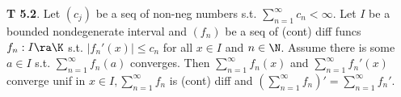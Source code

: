 {\bf T 5.2}. Let $(c_j)$ be a seq of non-neg numbers s.t. $\sum_{n=1}^{\infty} c_n < \infty$. Let $I$ be a bounded nondegenerate interval and $(f_n)$ be a seq of (cont) diff funcs $f_n:  I \ra \K$ s.t. $|f_n'(x)|\leq c_n$ for all $x \in I$ and $n \in \N$. Assume there is some $a \in I$ s.t. $\sum_{n=1}^{\infty}f_n(a)$ converges. Then $\sum_{n=1}^{\infty}f_n(x)$ and $\sum_{n=1}^{\infty}f_n'(x)$ converge unif in $x \in I, \sum_{n=1}^{\infty}f_n$ is (cont) diff and $(\sum_{n=1}^{\infty}f_n)'=\sum_{n=1}^{\infty}f_n'$.